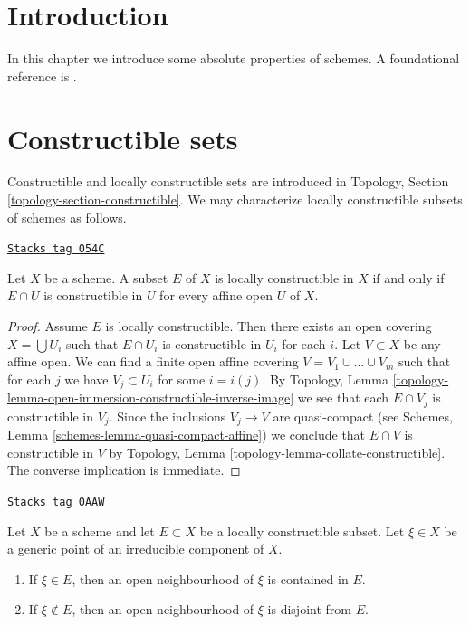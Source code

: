 \section{Introduction}
\label{properties-section-introduction}
In this chapter we introduce some absolute properties of schemes.
A foundational reference is \cite{EGA}.

\section{Constructible sets}
\label{properties-section-constructible}
Constructible and locally constructible sets are introduced in
Topology, Section \ref{topology-section-constructible}.
We may characterize locally constructible subsets of schemes as
follows.

\begin{lemma}
\label{properties-lemma-locally-constructible}
\href{https://stacks.math.columbia.edu/tag/054C}{\texttt{Stacks tag 054C}}

Let $X$ be a scheme.
A subset $E$ of $X$ is locally constructible in $X$ if and only if
$E \cap U$ is constructible in $U$ for every affine open $U$ of $X$.
\end{lemma}

\begin{proof}
Assume $E$ is locally constructible. Then there exists an open covering
$X = \bigcup U_i$ such that $E \cap U_i$ is constructible in $U_i$
for each $i$. Let $V \subset X$ be any affine open. We can find a finite
open affine covering $V = V_1 \cup \ldots \cup V_m$ such that for each $j$
we have $V_j \subset U_i$ for some $i = i(j)$. By
Topology, Lemma \ref{topology-lemma-open-immersion-constructible-inverse-image}
we see that each $E \cap V_j$ is constructible in $V_j$. Since the inclusions
$V_j \to V$ are quasi-compact (see
Schemes, Lemma \ref{schemes-lemma-quasi-compact-affine})
we conclude that $E \cap V$ is constructible in $V$ by
Topology, Lemma \ref{topology-lemma-collate-constructible}.
The converse implication is immediate.
\end{proof}

\begin{lemma}
\label{properties-lemma-generic-point-in-constructible}
\href{https://stacks.math.columbia.edu/tag/0AAW}{\texttt{Stacks tag 0AAW}}

Let $X$ be a scheme and let $E \subset X$ be a locally constructible subset.
Let $\xi \in X$ be a generic point of an irreducible component of $X$.
\begin{enumerate}
\item If $\xi \in E$, then an open neighbourhood of
$\xi$ is contained in $E$.
\item If $\xi \not \in E$, then an open neighbourhood
of $\xi$ is disjoint from $E$.
\end{enumerate}
\end{lemma}

